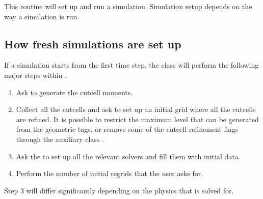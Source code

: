\documentclass[letterpaper,10pt,english]{sphinxmanual}
\begin{document}
This routine will set up and run a simulation.
Simulation setup depends on the way a simulation is run.


\subsection{How fresh simulations are set up}
\label{\detokenize{Driver:how-fresh-simulations-are-set-up}}
If a simulation starts from the first time step, the  class will perform the following major steps within .
\begin{enumerate}
%
\item {} 
Ask  to generate the cut\sphinxhyphen{}cell moments.

\item {} 
Collect all the cut\sphinxhyphen{}cells and ask  to set up an initial grid where all the cut\sphinxhyphen{}cells are refined.
It is possible to restrict the maximum level that can be generated from the geometric tags, or remove some of the cut\sphinxhyphen{}cell refinement flags through the auxiliary class .

\item {} 
Ask the  to set up all the relevant solvers and fill them with initial data.

\item {} 
Perform the number of initial regrids that the user asks for.

\end{enumerate}

Step 3 will differ significantly depending on the physics that is solved for.
\end{document}
